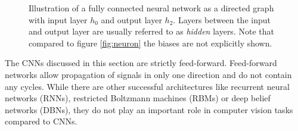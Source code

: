 \begin{figure}[H]
    \centering
{}
\caption[Illustration of fully connected layers]{Illustration of a fully connected neural network as a directed graph with input layer $h_0$ and output layer $h_2$. Layers between the input and output layer are usually referred to as \emph{hidden} layers. Note that compared to figure \ref{fig:neuron} the biases are not explicitly shown.}\label{fig:fully-connected}
\end{figure}\noindent
The CNNs discussed in this section are strictly feed-forward. Feed-forward networks allow propagation of signals in only one direction and do not contain any cycles. While there are other successful architectures like recurrent neural networks (RNNs), restricted Boltzmann machines (RBMs) or deep belief networks (DBNs), they do not play an important role in computer vision tasks compared to CNNs.
